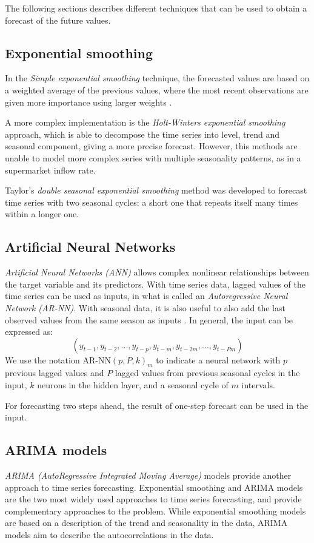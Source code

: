 The following sections describes different techniques that can be used to obtain a forecast of the future values.


\subsection{Exponential smoothing}
\label{subsec:exponential_smoothing}
In the \emph{Simple exponential smoothing} technique, the forecasted values are based on a weighted average of the previous values, where the most recent observations are given more importance using larger weights \cite{hyndman}.

A more complex implementation is the \emph{Holt-Winters exponential smoothing} approach, which is able to decompose the time series into level, trend and seasonal component, giving a more precise forecast. However, this methods are unable to model more complex series with multiple seasonality patterns, as in a supermarket inflow rate.

Taylor’s \emph{double seasonal exponential smoothing} method \cite{taylor} was developed to forecast time series with two seasonal cycles: a short one that repeats itself many times within a longer one.


\subsection{Artificial Neural Networks}
\label{subsec:artificial_neural_networks}
\emph{Artificial Neural Networks (ANN)} allows complex nonlinear relationships between the target variable and its predictors. With time series data, lagged values of the time series can be used as inputs, in what is called an \emph{Autoregressive Neural Network (AR-NN)}. With seasonal data, it is also useful to also add the last observed values from the same season as inputs \cite{hyndman}. In general, the input can be expressed as:
\[ (y_{t-1}, y_{t-2}, ..., y_{t-p}, y_{t-m}, y_{t-2m}, ..., y_{t-Pm}) \]
We use the notation \( \text{AR-NN}(p, P, k)_m \) to indicate a neural network with \( p \) previous lagged values and \( P \) lagged values from previous seasonal cycles in the input, \( k \) neurons in the hidden layer, and a seasonal cycle of \( m \) intervals.

For forecasting two steps ahead, the result of one-step forecast can be used in the input.

\subsection{ARIMA models}
\label{subsec:arima_models}
\emph{ARIMA (AutoRegressive Integrated Moving Average)} models provide another approach to time series forecasting. Exponential smoothing and ARIMA models are the two most widely used approaches to time series forecasting, and provide complementary approaches to the problem. While exponential smoothing models are based on a description of the trend and seasonality in the data, ARIMA models aim to describe the autocorrelations in the data.\cite{hyndman}

